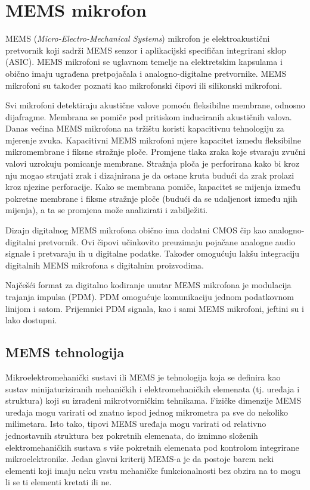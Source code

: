 \section{MEMS mikrofon}

MEMS (\textit{Micro-Electro-Mechanical Systems}) mikrofon je elektroakustični pretvornik koji sadrži MEMS senzor i aplikacijski specifičan integrirani sklop (ASIC). MEMS mikrofoni se uglavnom temelje na elektretskim kapsulama i obično imaju ugrađena pretpojačala i analogno-digitalne pretvornike. MEMS mikrofoni su također poznati kao mikrofonski čipovi ili silikonski mikrofoni.

Svi mikrofoni detektiraju akustične valove pomoću fleksibilne membrane, odnosno dijafragme. Membrana se pomiče pod pritiskom induciranih akustičnih valova. Danas većina MEMS mikrofona na tržištu koristi kapacitivnu tehnologiju za mjerenje zvuka. Kapacitivni MEMS mikrofoni mjere kapacitet između fleksibilne mikromembrane i fiksne stražnje ploče. Promjene tlaka zraka koje stvaraju zvučni valovi uzrokuju pomicanje membrane. Stražnja ploča je perforirana kako bi kroz nju mogao strujati zrak i dizajnirana je da ostane kruta budući da zrak prolazi kroz njezine perforacije. Kako se membrana pomiče, kapacitet se mijenja između pokretne membrane i fiksne stražnje ploče (budući da se udaljenost između njih mijenja), a ta se promjena može analizirati i zabilježiti.

Dizajn digitalnog MEMS mikrofona obično ima dodatni CMOS čip kao analogno-digitalni pretvornik. Ovi čipovi učinkovito preuzimaju pojačane analogne audio signale i pretvaraju ih u digitalne podatke. Također omogućuju lakšu integraciju digitalnih MEMS mikrofona s digitalnim proizvodima.

Najčešći format za digitalno kodiranje unutar MEMS mikrofona je modulacija trajanja impulsa (PDM). PDM omogućuje komunikaciju jednom podatkovnom linijom i satom. Prijemnici PDM signala, kao i sami MEMS mikrofoni, jeftini su i lako dostupni.

\subsection{MEMS tehnologija}
Mikroelektromehanički sustavi ili MEMS je tehnologija koja se definira kao sustav minijaturiziranih mehaničkih i elektromehaničkih elemenata (tj. uređaja i struktura) koji su izrađeni mikrotvorničkim tehnikama. Fizičke dimenzije MEMS uređaja mogu varirati od znatno ispod jednog mikrometra pa sve do nekoliko milimetara. Isto tako, tipovi MEMS uređaja mogu varirati od relativno jednostavnih struktura bez pokretnih elemenata, do iznimno složenih elektromehaničkih sustava s više pokretnih elemenata pod kontrolom integrirane mikroelektronike. Jedan glavni kriterij MEMS-a je da postoje barem neki elementi koji imaju neku vrstu mehaničke funkcionalnosti bez obzira na to mogu li se ti elementi kretati ili ne.


